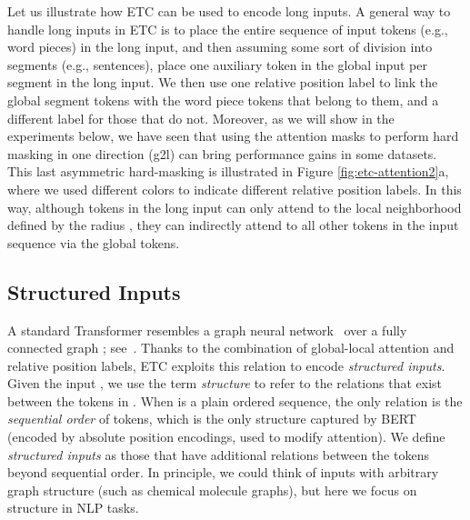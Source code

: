 \documentclass[11pt,a4paper]{article}
\begin{document}
Let us illustrate how ETC can be used to encode long inputs. A general way to handle long inputs in ETC is to place the entire sequence of input tokens (e.g., word pieces) in the long input, and then assuming some sort of division into segments (e.g., sentences), place one auxiliary token in the global input per segment in the long input. We then use one relative position label to link the global segment tokens with the word piece tokens that belong to them, and a different label for those that do not. Moreover, as we will show in the experiments below, we have seen that using the  attention masks to perform hard masking in one direction (g2l) can bring performance gains in some datasets. This last asymmetric hard-masking is illustrated in Figure \ref{fig:etc-attention2}a, where we used different colors to indicate different relative position labels. In this way, although tokens in the long input can only attend to the local neighborhood defined by the radius , they can indirectly attend to all other tokens in the input sequence via the global tokens. 

\subsection{Structured Inputs}\label{subsec:structure}

A standard Transformer resembles a graph neural network~\cite{scarselli2008graph} over a fully connected graph ; see~\citet{ye2019bp}. Thanks to the combination of global-local attention and relative position labels, ETC exploits this relation to encode {\em structured inputs}. 
Given the input , we use the term {\em structure} to refer to the relations that exist between the tokens in . When  is a plain ordered sequence, the only relation is the {\em sequential order} of tokens, which is the only structure captured by BERT (encoded by absolute position encodings, used to modify attention). We define {\em structured inputs} as those that have additional relations between the tokens beyond sequential order. In principle, we could think of inputs with arbitrary graph structure (such as chemical molecule graphs), but here we focus on structure in NLP tasks.
\end{document}
